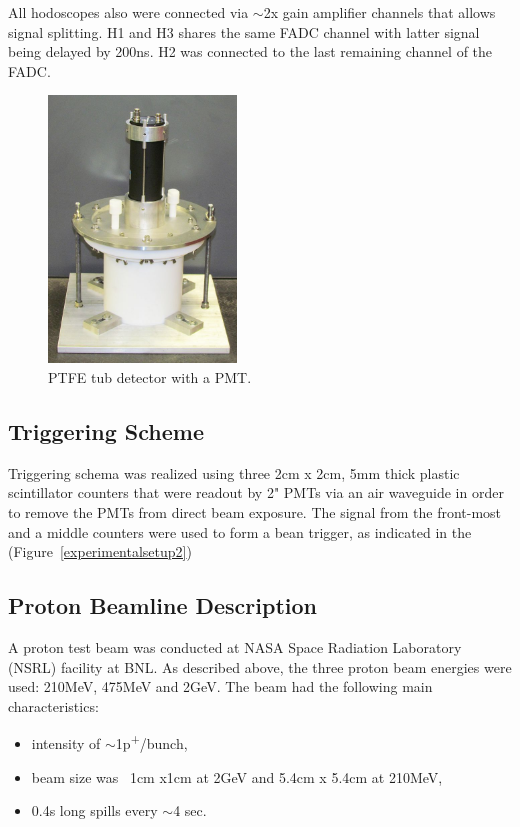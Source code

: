 \documentclass[preprint,12pt]{elsarticle}
\begin{document}
All hodoscopes also were connected via $\sim$2x gain amplifier channels that allows signal splitting. H1 and H3 shares the same FADC channel with latter signal being delayed by 200ns. H2 was connected to the last remaining channel of the FADC.





\begin{figure}[ht]
\centering
\includegraphics[width=50mm]{figure1_tub.jpg}
\caption{PTFE tub detector with a PMT.} \label{whitetubpicture}
\end{figure}

\subsection{Triggering Scheme}
\label{trigs}
Triggering schema was realized using three 2cm x 2cm, 5mm thick plastic scintillator counters that were readout by 2" PMTs via an air waveguide in order to remove the PMTs from direct beam exposure. The signal from the front-most and a middle counters were used to form a bean trigger, as indicated in the (Figure~\ref{experimentalsetup2})




\subsection{Proton Beamline Description}
A proton test beam was conducted at NASA Space Radiation Laboratory (NSRL) facility at BNL. As described above, the three proton beam energies were used:
210MeV, 475MeV and 2GeV. The beam had the following main characteristics:

\begin{itemize}
	\item intensity of $\sim$1p\textsuperscript{+}/bunch,
	\item beam size was ~1cm x1cm at 2GeV and 5.4cm x 5.4cm at 210MeV,
	\item 0.4s long spills every $\sim$4 sec.
\end{itemize}
\end{document}
